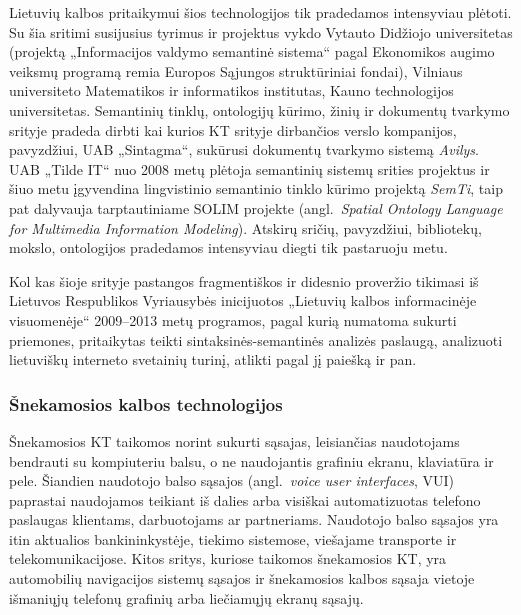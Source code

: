 \begin{multicols}{2}
    Lietuvių kalbos pritaikymui šios technologijos tik pradedamos intensyviau plėtoti. Su šia sritimi susijusius tyrimus ir projektus vykdo Vytauto Didžiojo universitetas (projektą „Informacijos valdymo semantinė sistema“ pagal Ekonomikos augimo veiksmų programą remia Europos Sąjungos struktūriniai fondai), Vilniaus universiteto Matematikos ir informatikos institutas, Kauno technologijos universitetas. Semantinių tinklų, ontologijų kūrimo, žinių ir dokumentų tvarkymo srityje pradeda dirbti kai kurios KT srityje dirbančios verslo kompanijos, pavyzdžiui, UAB „Sintagma“, sukūrusi dokumentų tvarkymo sistemą \textit{Avilys}. UAB „Tilde IT“ nuo 2008 metų plėtoja semantinių sistemų srities projektus ir šiuo metu įgyvendina lingvistinio semantinio tinklo kūrimo projektą \textit{SemTi}, taip pat dalyvauja tarptautiniame SOLIM projekte (angl.~\textit{Spatial Ontology Language for Multimedia Information Modeling}). Atskirų sričių, pavyzdžiui, bibliotekų, mokslo, ontologijos pradedamos intensyviau diegti tik pastaruoju metu.   

    Kol kas šioje srityje pastangos fragmentiškos ir didesnio proveržio tikimasi iš Lietuvos Respublikos Vyriausybės inicijuotos „Lietuvių kalbos informacinėje visuomenėje“ 2009–2013 metų programos, pagal kurią numatoma sukurti priemones, pritaikytas teikti sintaksinės-semantinės analizės paslaugą, analizuoti lietuviškų interneto svetainių turinį, atlikti pagal jį paiešką ir pan.
  
\subsubsection{Šnekamosios kalbos technologijos}

Šnekamosios KT taikomos norint sukurti sąsajas, leisiančias naudotojams bendrauti su kompiuteriu balsu, o ne naudojantis grafiniu ekranu, klaviatūra ir pele. Šiandien naudotojo balso sąsajos (angl.~\textit{voice user interfaces}, VUI) paprastai naudojamos teikiant iš dalies arba visiškai automatizuotas telefono paslaugas klientams, darbuotojams ar partneriams. Naudotojo balso sąsajos yra itin aktualios bankininkystėje, tiekimo sistemose, viešajame transporte ir telekomunikacijose. Kitos sritys, kuriose taikomos šnekamosios KT, yra automobilių navigacijos sistemų sąsajos ir šnekamosios kalbos sąsaja vietoje išmaniųjų telefonų grafinių arba liečiamųjų ekranų sąsajų.



\end{multicols}
